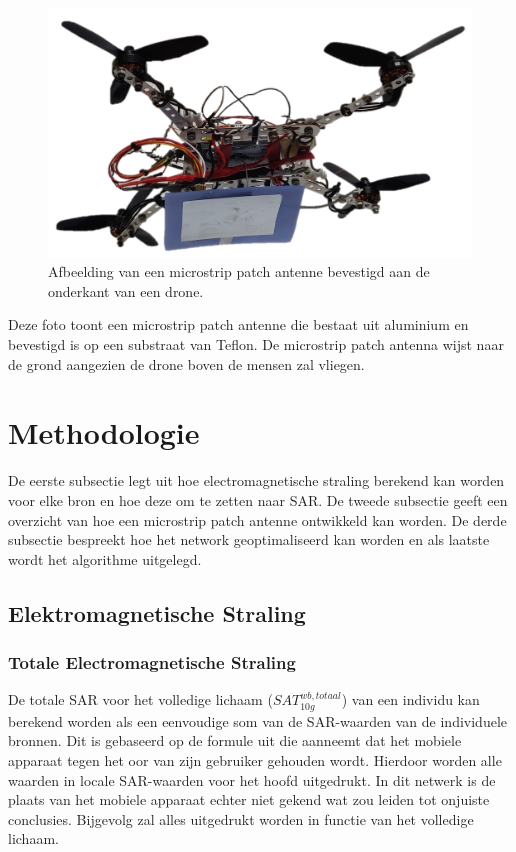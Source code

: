 \documentclass[twocolumn]{phdsymp_dutch}
\begin{document}
\begin{figure}[h]
\centering
  \includegraphics[width=\linewidth]{drone.png}
  \caption{Afbeelding van een microstrip patch antenne bevestigd aan de onderkant van een drone. }
  \label{fig:exampleDrone}
\end{figure}

Deze foto toont een microstrip patch antenne die bestaat 
uit aluminium en bevestigd is op een substraat van Teflon. De microstrip patch antenna 
wijst naar de grond aangezien de drone boven de mensen zal vliegen.

\section{Methodologie}

De eerste subsectie legt uit hoe electromagnetische straling berekend kan worden voor elke bron 
en hoe deze om te zetten naar \gls{SAR}.
De tweede subsectie geeft een overzicht van hoe een microstrip patch antenne ontwikkeld kan worden. 
De derde subsectie bespreekt hoe het network geoptimaliseerd kan worden en als laatste wordt het algorithme
uitgelegd.

\subsection{Elektromagnetische Straling}
\subsubsection{Totale Electromagnetische Straling}
De totale \gls{SAR} voor het volledige lichaam ($SAT^{wb,totaal}_{10g}$) van een individu 
kan berekend worden als een eenvoudige som van de \gls{SAR}-waarden van de individuele bronnen. 
Dit is gebaseerd op de formule uit \cite{J17_kuehn2019modelling} die aanneemt dat het mobiele apparaat 
tegen het oor van zijn gebruiker gehouden wordt. Hierdoor worden alle waarden in locale \gls{SAR}-waarden voor het hoofd uitgedrukt.
In dit netwerk is de plaats van het mobiele apparaat echter  niet  gekend wat zou leiden tot onjuiste conclusies. Bijgevolg 
zal alles uitgedrukt worden in functie van het volledige lichaam.
\end{document}
